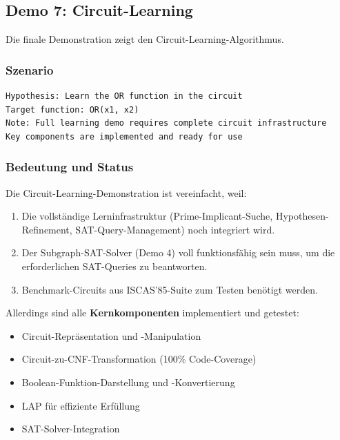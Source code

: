 ﻿\documentclass[a4paper,12pt]{article}
\theoremstyle{definition}
\begin{document}
\subsection{Demo 7: Circuit-Learning}

Die finale Demonstration zeigt den Circuit-Learning-Algorithmus.

\subsubsection{Szenario}

\begin{lstlisting}
Hypothesis: Learn the OR function in the circuit
Target function: OR(x1, x2)
Note: Full learning demo requires complete circuit infrastructure
Key components are implemented and ready for use
\end{lstlisting}

\subsubsection{Bedeutung und Status}

Die Circuit-Learning-Demonstration ist vereinfacht, weil:

\begin{enumerate}
    \item Die vollständige Lerninfrastruktur (Prime-Implicant-Suche, Hypothesen-Refinement, SAT-Query-Management) noch integriert wird.
    
    \item Der Subgraph-SAT-Solver (Demo 4) voll funktionsfähig sein muss, um die erforderlichen SAT-Queries zu beantworten.
    
    \item Benchmark-Circuits aus ISCAS'85-Suite zum Testen benötigt werden.
\end{enumerate}

Allerdings sind alle \textbf{Kernkomponenten} implementiert und getestet:
\begin{itemize}
    \item Circuit-Repräsentation und -Manipulation
    \item Circuit-zu-CNF-Transformation (100\% Code-Coverage)
    \item Boolean-Funktion-Darstellung und -Konvertierung
    \item LAP für effiziente Erfüllung
    \item SAT-Solver-Integration
\end{itemize}
\end{document}
